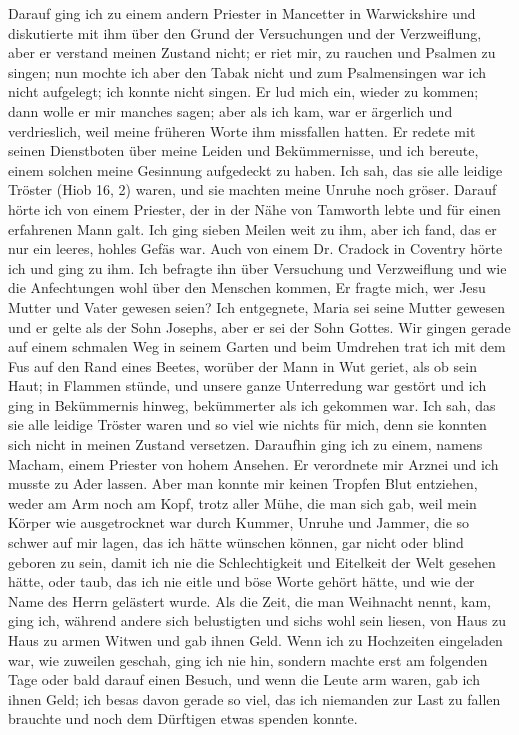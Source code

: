 Darauf ging ich zu einem andern Priester in Mancetter in
Warwickshire und diskutierte mit ihm über den Grund der Versuchungen 
und der Verzweiflung, aber er verstand meinen Zustand
nicht; er riet mir, zu rauchen und Psalmen zu singen; nun mochte
ich aber den Tabak nicht und zum Psalmensingen war ich nicht
aufgelegt; ich konnte nicht singen. Er lud mich ein, wieder zu
kommen; dann wolle er mir manches sagen; aber als ich kam,
war er ärgerlich und verdrieslich, weil meine früheren Worte ihm
missfallen hatten. Er redete mit seinen Dienstboten über meine
Leiden und Bekümmernisse, und ich bereute, einem solchen meine
Gesinnung aufgedeckt zu haben. Ich sah, das sie alle leidige
Tröster (Hiob 16, 2) waren, und sie machten meine Unruhe noch
gröser. Darauf hörte ich von einem Priester, der in der Nähe
von Tamworth lebte und für einen erfahrenen Mann galt. Ich
ging sieben Meilen weit zu ihm, aber ich fand, das er nur ein
leeres, hohles Gefäs war. Auch von einem Dr. Cradock in Coventry
hörte ich und ging zu ihm. Ich befragte ihn über Versuchung
und Verzweiflung und wie die Anfechtungen wohl über den
Menschen kommen, Er fragte mich, wer Jesu Mutter und Vater
gewesen seien? Ich entgegnete, Maria sei seine Mutter gewesen
und er gelte als der Sohn Josephs, aber er sei der Sohn Gottes.
Wir gingen gerade auf einem schmalen Weg in seinem Garten
und beim Umdrehen trat ich mit dem Fus auf den Rand eines
Beetes, worüber der Mann in Wut geriet, als ob sein Haut; in
Flammen stünde, und unsere ganze Unterredung war gestört und
ich ging in Bekümmernis hinweg, bekümmerter als ich gekommen
war. Ich sah, das sie alle leidige Tröster waren und so viel
wie nichts für mich, denn sie konnten sich nicht in meinen Zustand
versetzen. Daraufhin ging ich zu einem, namens Macham, einem
Priester von hohem Ansehen. Er verordnete mir Arznei und ich
musste zu Ader lassen. Aber man konnte mir keinen Tropfen Blut
entziehen, weder am Arm noch am Kopf, trotz aller Mühe, die
man sich gab, weil mein Körper wie ausgetrocknet war
durch Kummer, Unruhe und Jammer, die so schwer auf mir
lagen, das ich hätte wünschen können, gar nicht oder blind geboren 
zu sein, damit ich nie die Schlechtigkeit und Eitelkeit der
Welt gesehen hätte, oder taub, das ich nie eitle und böse Worte
gehört hätte, und wie der Name des Herrn gelästert wurde. Als
die Zeit, die man Weihnacht nennt, kam, ging ich, während andere
sich belustigten und sichs wohl sein liesen, von Haus zu Haus zu
armen Witwen und gab ihnen Geld. Wenn ich zu Hochzeiten eingeladen 
war, wie zuweilen geschah, ging ich nie hin, sondern machte
erst am folgenden Tage oder bald darauf einen Besuch, und wenn
die Leute arm waren, gab ich ihnen Geld; ich besas davon gerade 
so viel, das ich niemanden zur Last zu fallen brauchte und
noch dem Dürftigen etwas spenden konnte.

